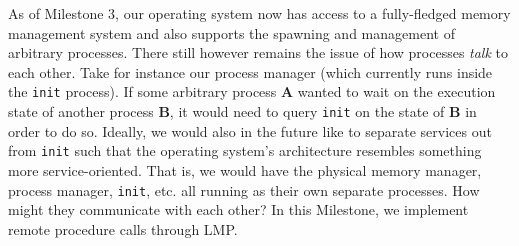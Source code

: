 As of Milestone 3, our operating system now has access to a fully-fledged memory management system and also supports the spawning and management of arbitrary processes. There still however remains the issue of how processes \textit{talk} to each other. Take for instance our process manager (which currently runs inside the \texttt{init} process). If some arbitrary process \textbf{A} wanted to wait on the execution state of another process \textbf{B}, it would need to query \texttt{init} on the state of \textbf{B} in order to do so. Ideally, we would also in the future like to separate services out from \texttt{init} such that the operating system's architecture resembles something more service-oriented. That is, we would have the physical memory manager, process manager, \texttt{init}, etc. all running as their own separate processes. How might they communicate with each other? In this Milestone, we implement remote procedure calls through LMP.


